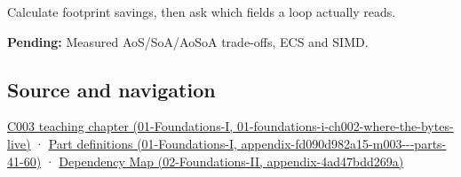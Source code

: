 Calculate footprint savings, then ask which fields a loop actually reads.

\textbf{Pending:} Measured AoS/SoA/AoSoA trade-offs, ECS and SIMD.

\subsection{Source and navigation}\label{appendix-5522ad176ca0-source-and-navigation}

\href{../01-Foundations-I/main.pdf\#nameddest=01-foundations-i-ch002-where-the-bytes-live}{C003 teaching chapter (01-Foundations-I, 01-foundations-i-ch002-where-the-bytes-live)} · \href{../01-Foundations-I/main.pdf\#nameddest=appendix-fd090d982a15-m003---parts-41-60}{Part definitions (01-Foundations-I, appendix-fd090d982a15-m003-\/-\/-parts-41-60)} · \href{../02-Foundations-II/main.pdf\#nameddest=appendix-4ad47bdd269a}{Dependency Map (02-Foundations-II, appendix-4ad47bdd269a)}

